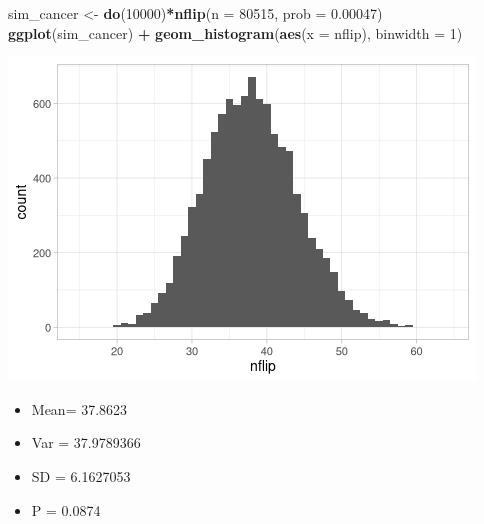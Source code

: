 \documentclass[
  10pt,
]{article}
\newenvironment{Shaded}{\begin{snugshade}}{\end{snugshade}}
\newcommand{\AttributeTok}[1]{\textcolor[rgb]{0.13,0.29,0.53}{#1}}
\newcommand{\DecValTok}[1]{\textcolor[rgb]{0.00,0.00,0.81}{#1}}
\newcommand{\FloatTok}[1]{\textcolor[rgb]{0.00,0.00,0.81}{#1}}
\newcommand{\FunctionTok}[1]{\textcolor[rgb]{0.13,0.29,0.53}{\textbf{#1}}}
\newcommand{\NormalTok}[1]{#1}
\newcommand{\OtherTok}[1]{\textcolor[rgb]{0.56,0.35,0.01}{#1}}
\newcommand{\SpecialCharTok}[1]{\textcolor[rgb]{0.81,0.36,0.00}{\textbf{#1}}}
\providecommand{\tightlist}{%
  \setlength{\itemsep}{0pt}\setlength{\parskip}{0pt}}
\begin{document}
\begin{Shaded}
\begin{Highlighting}[]
\NormalTok{sim\_cancer }\OtherTok{\textless{}{-}} \FunctionTok{do}\NormalTok{(}\DecValTok{10000}\NormalTok{)}\SpecialCharTok{*}\FunctionTok{nflip}\NormalTok{(}\AttributeTok{n =} \DecValTok{80515}\NormalTok{, }\AttributeTok{prob =} \FloatTok{0.00047}\NormalTok{)}
\FunctionTok{ggplot}\NormalTok{(sim\_cancer) }\SpecialCharTok{+} 
  \FunctionTok{geom\_histogram}\NormalTok{(}\FunctionTok{aes}\NormalTok{(}\AttributeTok{x =}\NormalTok{ nflip), }\AttributeTok{binwidth =} \DecValTok{1}\NormalTok{)}
\end{Highlighting}
\end{Shaded}

\includegraphics{05.pvalues_files/figure-latex/unnamed-chunk-8-1.png}

\begin{itemize}
\tightlist
\item
  Mean= 37.8623
\item
  Var = 37.9789366
\item
  SD = 6.1627053
\item
  P = 0.0874
\end{itemize}

\newpage
\end{document}
